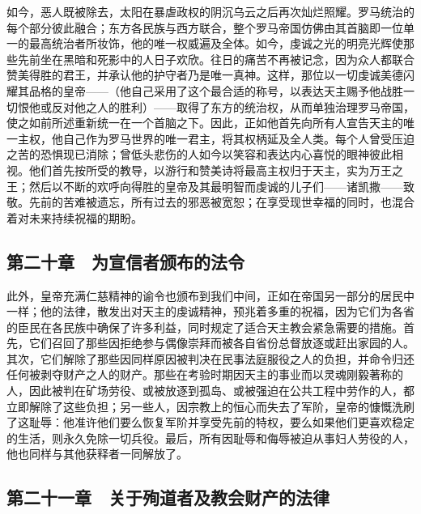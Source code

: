 如今，恶人既被除去，太阳在暴虐政权的阴沉乌云之后再次灿烂照耀。罗马统治的每个部分彼此融合；东方各民族与西方联合，整个罗马帝国仿佛由其首脑即一位单一的最高统治者所妆饰，他的唯一权威遍及全体。如今，虔诚之光的明亮光辉使那些先前坐在黑暗和死影中的人日子欢欣。往日的痛苦不再被记念，因为众人都联合赞美得胜的君王，并承认他的护守者乃是唯一真神。这样，那位以一切虔诚美德闪耀其品格的皇帝——（他自己采用了这个最合适的称号，以表达天主赐予他战胜一切恨他或反对他之人的胜利）——取得了东方的统治权，从而单独治理罗马帝国，使之如前所述重新统一在一个首脑之下。因此，正如他首先向所有人宣告天主的唯一主权，他自己作为罗马世界的唯一君主，将其权柄延及全人类。每个人曾受压迫之苦的恐惧现已消除；曾低头悲伤的人如今以笑容和表达内心喜悦的眼神彼此相视。他们首先按所受的教导，以游行和赞美诗将最高主权归于天主，实为万王之王；然后以不断的欢呼向得胜的皇帝及其最明智而虔诚的儿子们——诸凯撒——致敬。先前的苦难被遗忘，所有过去的邪恶被宽恕；在享受现世幸福的同时，也混合着对未来持续祝福的期盼。\par


\subsection{第二十章　为宣信者颁布的法令}

此外，皇帝充满仁慈精神的谕令也颁布到我们中间，正如在帝国另一部分的居民中一样；他的法律，散发出对天主的虔诚精神，预兆着多重的祝福，因为它们为各省的臣民在各民族中确保了许多利益，同时规定了适合天主教会紧急需要的措施。首先，它们召回了那些因拒绝参与偶像崇拜而被各自省份总督放逐或赶出家园的人。其次，它们解除了那些因同样原因被判决在民事法庭服役之人的负担，并命令归还任何被剥夺财产之人的财产。那些在考验时期因天主的事业而以灵魂刚毅著称的人，因此被判在矿场劳役、或被放逐到孤岛、或被强迫在公共工程中劳作的人，都立即解除了这些负担；另一些人，因宗教上的恒心而失去了军阶，皇帝的慷慨洗刷了这耻辱：他准许他们要么恢复军阶并享受先前的特权，要么如果他们更喜欢稳定的生活，则永久免除一切兵役。最后，所有因耻辱和侮辱被迫从事妇人劳役的人，他也同样与其他获释者一同解放了。\par


\subsection{第二十一章　关于殉道者及教会财产的法律}

